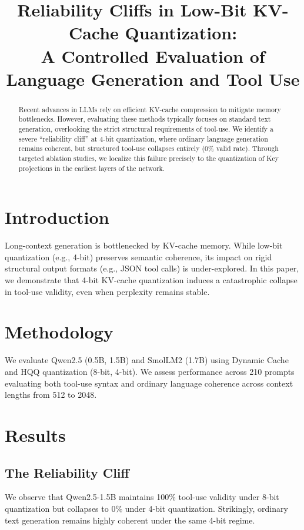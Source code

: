 \documentclass[11pt,a4paper]{article}
\title{Reliability Cliffs in Low-Bit KV-Cache Quantization: \\ A Controlled Evaluation of Language Generation and Tool Use}
\begin{document}
\maketitle

\begin{abstract}
Recent advances in LLMs rely on efficient KV-cache compression to mitigate memory bottlenecks. However, evaluating these methods typically focuses on standard text generation, overlooking the strict structural requirements of tool-use. We identify a severe ``reliability cliff'' at 4-bit quantization, where ordinary language generation remains coherent, but structured tool-use collapses entirely (0\% valid rate). Through targeted ablation studies, we localize this failure precisely to the quantization of Key projections in the earliest layers of the network.
\end{abstract}

\section{Introduction}
Long-context generation is bottlenecked by KV-cache memory. While low-bit quantization (e.g., 4-bit) preserves semantic coherence, its impact on rigid structural output formats (e.g., JSON tool calls) is under-explored. In this paper, we demonstrate that 4-bit KV-cache quantization induces a catastrophic collapse in tool-use validity, even when perplexity remains stable.

\section{Methodology}
We evaluate Qwen2.5 (0.5B, 1.5B) and SmolLM2 (1.7B) using Dynamic Cache and HQQ quantization (8-bit, 4-bit). We assess performance across 210 prompts evaluating both tool-use syntax and ordinary language coherence across context lengths from 512 to 2048.

\section{Results}
\subsection{The Reliability Cliff}
We observe that Qwen2.5-1.5B maintains 100\% tool-use validity under 8-bit quantization but collapses to 0\% under 4-bit quantization. Strikingly, ordinary text generation remains highly coherent under the same 4-bit regime.
\end{document}
